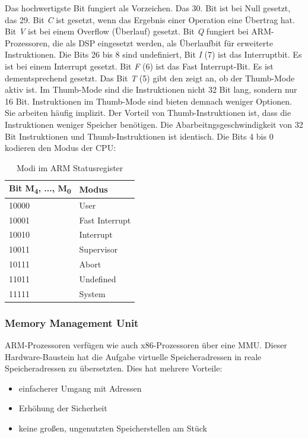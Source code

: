 Das hochwertigste Bit fungiert als Vorzeichen. Das 30. Bit ist bei Null gesetzt, das 29. Bit \textit{C} ist gesetzt, wenn das Ergebnis einer Operation eine Übertrag hat. Bit \textit{V} ist bei einem Overflow (Überlauf) gesetzt. Bit \textit{Q} fungiert bei ARM-Prozessoren, die als \ac{DSP} eingesetzt werden, als Überlaufbit für erweiterte Instruktionen. Die Bits 26 bis 8 sind undefiniert, Bit \textit{I} (7) ist das Interruptbit. Es ist bei einem Interrupt gesetzt. Bit \textit{F} (6) ist das Fast Interrupt-Bit. Es ist dementsprechend gesetzt. Das Bit \textit{T} (5) gibt den zeigt an, ob der Thumb-Mode aktiv ist. Im Thumb-Mode sind die Instruktionen nicht 32 Bit lang, sondern nur 16 Bit. Instruktionen im Thumb-Mode sind bieten demnach weniger Optionen. Sie arbeiten häufig implizit. Der Vorteil von Thumb-Instruktionen ist, dass die Instruktionen weniger Speicher benötigen. Die Abarbeitngsgeschwindigkeit von 32 Bit Instruktionen und Thumb-Instruktionen ist identisch. Die Bits 4 bis 0 kodieren den Modus der CPU:
\begin{table}
    \begin{tabular}{l|l}
    Bit M\textsubscript{4}, ..., M\textsubscript{0}  & Modus          \\ \hline
    10000 & User           \\
    10001 & Fast Interrupt \\
    10010 & Interrupt      \\
    10011 & Supervisor     \\
    10111 & Abort          \\
    11011 & Undefined      \\
    11111 & System         \\
    \end{tabular}
    \caption {Modi im ARM Statusregister}
\end{table}

\subsubsection{Memory Management Unit}
ARM-Prozessoren verfügen wie auch x86-Prozessoren über eine \ac{MMU}. Dieser Hardware-Baustein hat die Aufgabe virtuelle Speicheradressen in reale Speicheradressen zu übersetzten. Dies hat mehrere Vorteile: 
\begin{itemize}
\item einfacherer Umgang mit Adressen
\item Erhöhung der Sicherheit 
\item keine großen, ungenutzten Speicherstellen am Stück 
\end{itemize}

